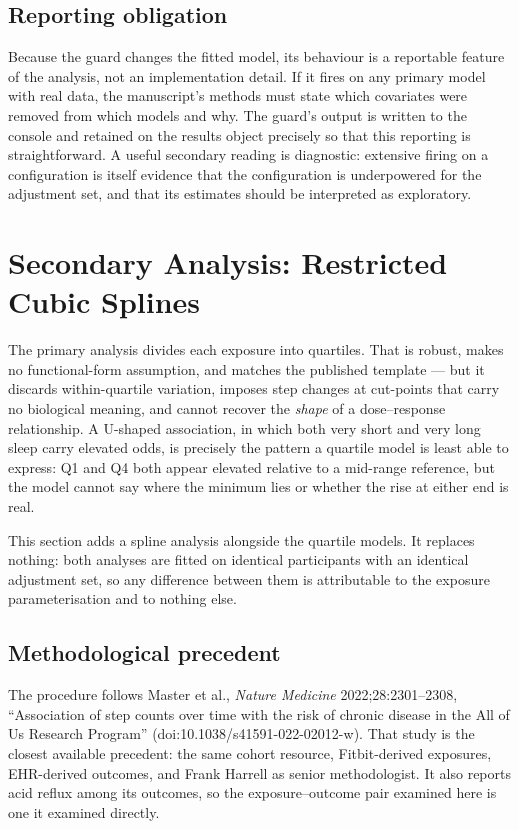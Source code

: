 \documentclass[11pt]{article}
\begin{document}
\subsection{Reporting obligation}
Because the guard changes the fitted model, its behaviour is a reportable feature of the analysis, not
an implementation detail. If it fires on any primary model with real data, the manuscript's methods
must state which covariates were removed from which models and why. The guard's output is written to
the console and retained on the results object precisely so that this reporting is straightforward.
A useful secondary reading is diagnostic: extensive firing on a configuration is itself evidence that
the configuration is underpowered for the adjustment set, and that its estimates should be
interpreted as exploratory.

\section{Secondary Analysis: Restricted Cubic Splines}
The primary analysis divides each exposure into quartiles. That is robust,
makes no functional-form assumption, and matches the published template --- but
it discards within-quartile variation, imposes step changes at cut-points that
carry no biological meaning, and cannot recover the \emph{shape} of a
dose--response relationship. A U-shaped association, in which both very short
and very long sleep carry elevated odds, is precisely the pattern a quartile
model is least able to express: Q1 and Q4 both appear elevated relative to a
mid-range reference, but the model cannot say where the minimum lies or whether
the rise at either end is real.

This section adds a spline analysis alongside the quartile models. It replaces
nothing: both analyses are fitted on identical participants with an identical
adjustment set, so any difference between them is attributable to the exposure
parameterisation and to nothing else.

\subsection{Methodological precedent} The procedure follows Master et al.,
\emph{Nature Medicine} 2022;28:2301--2308,
``Association of step counts over time with the risk of chronic disease in the
All of Us Research Program'' (doi:10.1038/s41591-022-02012-w). That study is the
closest available precedent: the same cohort resource, Fitbit-derived exposures,
EHR-derived outcomes, and Frank Harrell as senior methodologist. It also reports
acid reflux among its outcomes, so the exposure--outcome pair examined here is
one it examined directly.
\end{document}
